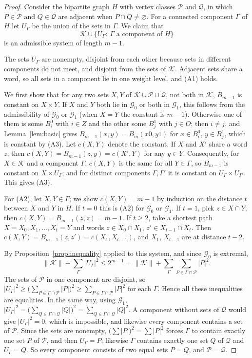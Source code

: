 \documentclass[11pt]{amsart}
\theoremstyle{definition}
\theoremstyle{remark}
\numberwithin{equation}{section}
\newcommand{\cG}{\mathcal{G}}
\newcommand{\cK}{\mathcal{K}}
\newcommand{\cP}{\mathcal{P}}
\newcommand{\cQ}{\mathcal{Q}}
\begin{document}
\begin{proof}
Consider the bipartite graph $H$ with vertex classes $\cP$ and $\cQ$, in which $P\in\cP$ and $Q\in\cQ$ are adjacent when $P\cap Q\ne\varnothing$. For a connected component $\Gamma$ of $H$ let $U_\Gamma$ be the union of the sets in $\Gamma$. We claim that
\[
\cK\cup\{U_\Gamma:\ \Gamma\text{ a component of }H\}
\]
is an admissible system of length $m-1$.

The sets $U_\Gamma$ are nonempty, disjoint from each other because sets in different components do not meet, and disjoint from the sets of $\cK$. Adjacent sets share a word, so all sets in a component lie in one weight level, and (A1) holds.

We first show that for any two sets $X,Y$ of $\cK\cup\cP\cup\cQ$, not both in $\cK$, $B_{m-1}$ is constant on $X\times Y$. If $X$ and $Y$ both lie in $\cG_0$ or both in $\cG_1$, this follows from the admissibility of $\cG_0$ or $\cG_1$ (when $X=Y$ the constant is $m-1$). Otherwise one of them is some $B_i^0$ with $i\in Z$ and the other some $B_j^1$ with $j\in O$; then $i\ne j$, and Lemma~\ref{lem:basic} gives $B_{m-1}(x,y)=B_m(x0,y1)$ for $x\in B_i^0$, $y\in B_j^1$, which is constant by (A3). Let $c(X,Y)$ denote the constant. If $X$ and $X'$ share a word $z$, then $c(X,Y)=B_{m-1}(z,y)=c(X',Y)$ for any $y\in Y$. Consequently, for $X\in\cK$ and a component $\Gamma$, $c(X,Y)$ is the same for all $Y\in\Gamma$, so $B_{m-1}$ is constant on $X\times U_\Gamma$; and for distinct components $\Gamma,\Gamma'$ it is constant on $U_\Gamma\times U_{\Gamma'}$. This gives (A3).

For (A2), let $X,Y\in\Gamma$; we show $c(X,Y)=m-1$ by induction on the distance $t$ between $X$ and $Y$ in $H$. If $t=0$ this is (A2) for $\cG_0$ or $\cG_1$. If $t=1$, pick $z\in X\cap Y$; then $c(X,Y)=B_{m-1}(z,z)=m-1$. If $t\ge2$, take a shortest path $X=X_0,X_1,\dots,X_t=Y$ and words $z\in X_0\cap X_1$, $z'\in X_{t-1}\cap X_t$. Then $c(X,Y)=B_{m-1}(z,z')=c(X_1,X_{t-1})$, and $X_1$, $X_{t-1}$ are at distance $t-2$.

By Proposition~\ref{prop:inequality} applied to this system, and since $\cG_0$ is extremal,
\[
\|\cK\|+\sum_\Gamma|U_\Gamma|^2\le 2^{m-1}=\|\cK\|+\sum_\Gamma\sum_{P\in\Gamma\cap\cP}|P|^2 .
\]
The sets of $\cP$ in one component are disjoint, so $|U_\Gamma|^2\ge\bigl(\sum_{P\in\Gamma\cap\cP}|P|\bigr)^2\ge\sum_{P\in\Gamma\cap\cP}|P|^2$ for each $\Gamma$. Hence all these inequalities are equalities. In the same way, using $\cG_1$, $|U_\Gamma|^2=\bigl(\sum_{Q\in\Gamma\cap\cQ}|Q|\bigr)^2=\sum_{Q\in\Gamma\cap\cQ}|Q|^2$. A component without sets of $\cQ$ would give $|U_\Gamma|^2=0$, which is impossible, and likewise every component contains a set of $\cP$. Since the sets are nonempty, $\bigl(\sum|P|\bigr)^2=\sum|P|^2$ forces $\Gamma$ to contain exactly one set $P$ of $\cP$, and then $U_\Gamma=P$; likewise $\Gamma$ contains exactly one set $Q$ of $\cQ$ and $U_\Gamma=Q$. So every component consists of two equal sets $P=Q$, and $\cP=\cQ$.
\end{proof}
\end{document}
